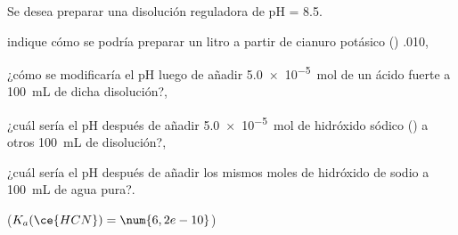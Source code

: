 Se desea preparar una disolución reguladora de pH = \num{8,5}.
\begin{enumerate*}[label={\alph*)},font=\bfseries]
	\item indique cómo se podría preparar un litro a partir de cianuro potásico () \SI{,010}{\Molar},
	\item ¿cómo se modificaría el pH luego de añadir \SI{5,0e-5}{\mol} de un ácido fuerte a \SI{100}{\milli\liter} de dicha disolución?,
	\item ¿cuál sería el pH después de añadir \SI{5,0e-5}{\mol} de hidróxido sódico () a otros \SI{100}{\milli\liter} de disolución?,
	\item ¿cuál sería el pH después de añadir los mismos moles de hidróxido de sodio a \SI{100}{\milli\liter} de agua pura?.
\end{enumerate*}
($K_a(\ce{HCN}) = \num{6,2e-10}$)
